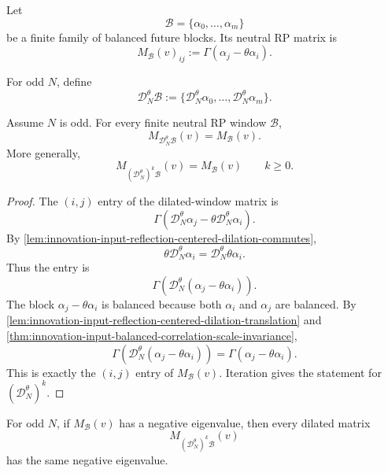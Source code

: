 \begin{definition}
\label{def:innovation-input-finite-neutral-rp-window}
Let
$$
\mathcal B=\{\alpha_0,\ldots,\alpha_m\}
$$
be a finite family of balanced future blocks. Its neutral RP matrix is
$$
M_{\mathcal B}(v)_{ij}
:=
\Gamma(\alpha_j-\theta\alpha_i).
$$
\end{definition}

\begin{definition}
\label{def:innovation-input-reflection-centered-window-dilation}
For odd $N$, define
$$
\mathcal D_N^\theta\mathcal B
:=
\{\mathcal D_N^\theta\alpha_0,\ldots,\mathcal D_N^\theta\alpha_m\}.
$$
\end{definition}

\begin{theorem}
\label{thm:innovation-input-odd-rp-window-self-similarity}
Assume $N$ is odd. For every finite neutral RP window $\mathcal B$,
$$
M_{\mathcal D_N^\theta\mathcal B}(v)
=
M_{\mathcal B}(v).
$$
More generally,
$$
M_{(\mathcal D_N^\theta)^k\mathcal B}(v)
=
M_{\mathcal B}(v)
\qquad
k\ge0.
$$
\end{theorem}

\begin{proof}
The $(i,j)$ entry of the dilated-window matrix is
$$
\Gamma(
\mathcal D_N^\theta\alpha_j
-\theta\mathcal D_N^\theta\alpha_i
).
$$
By
\autoref{lem:innovation-input-reflection-centered-dilation-commutes},
$$
\theta\mathcal D_N^\theta\alpha_i
=
\mathcal D_N^\theta\theta\alpha_i.
$$
Thus the entry is
$$
\Gamma(
\mathcal D_N^\theta(\alpha_j-\theta\alpha_i)
).
$$
The block $\alpha_j-\theta\alpha_i$ is balanced because both
$\alpha_i$ and $\alpha_j$ are balanced. By
\autoref{lem:innovation-input-reflection-centered-dilation-translation}
and
\autoref{thm:innovation-input-balanced-correlation-scale-invariance},
$$
\Gamma(
\mathcal D_N^\theta(\alpha_j-\theta\alpha_i)
)
=
\Gamma(\alpha_j-\theta\alpha_i).
$$
This is exactly the $(i,j)$ entry of $M_{\mathcal B}(v)$. Iteration gives
the statement for $(\mathcal D_N^\theta)^k$.
\end{proof}

\begin{corollary}
\label{cor:innovation-input-scale-copying-rp-failure}
For odd $N$, if $M_{\mathcal B}(v)$ has a negative eigenvalue, then every
dilated matrix
$$
M_{(\mathcal D_N^\theta)^k\mathcal B}(v)
$$
has the same negative eigenvalue.
\end{corollary}

